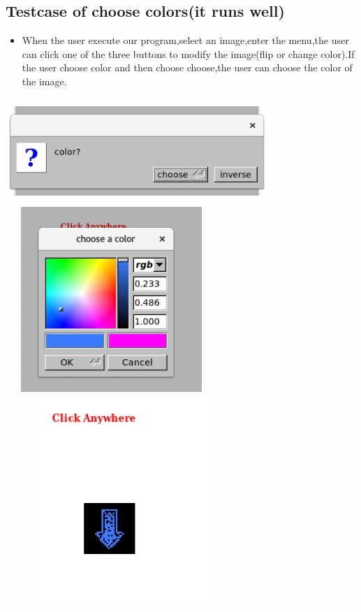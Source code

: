 \documentclass{article}
\begin{document}
\subsection*{Testcase of choose colors(it runs well)}
\begin{itemize}
	\item When the user execute our program,select an image,enter the menu,the user can click one of the three buttons to modify the image(flip or change color).If the user choose color and then choose choose,the user can choose the color of the image.
\end{itemize}
\includegraphics[width = 10cm, height = 4cm]{cc1.png}
\includegraphics[width = 8cm, height = 7cm]{cc2.png}
\includegraphics[width = 9cm, height = 8cm]{cc3.png}
\end{document}
